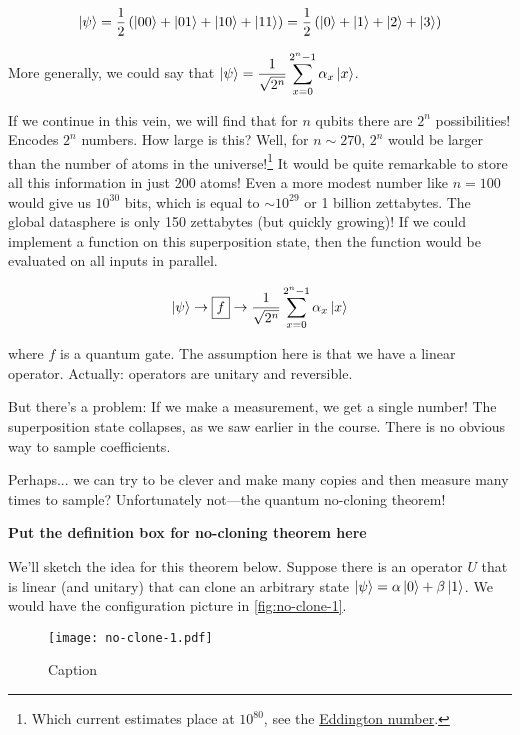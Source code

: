 \documentclass[12pt, english]{book}
\begin{document}
\begin{equation*}
	\ket{\psi} = \frac{1}{2} \left( \ket{00} + \ket{01} + \ket{10} + \ket{11} \right) = \frac{1}{2} \left( \ket{0} + \ket{1} + \ket{2} + \ket{3} \right)
\end{equation*}

More generally, we could say that $\ket{\psi} = \dfrac{1}{\sqrt{2^n}} \displaystyle\sum_{x=0}^{2^n-1} \alpha_x \ket{x}$.

If we continue in this vein, we will find that for $n$ qubits there are $2^n$ possibilities!
Encodes $2^n$ numbers. 
How large is this? 
Well, for $n \sim 270$, $2^n$ would be larger than the number of atoms in the universe!\footnote{Which current estimates place at $10^{80}$, see the \href{https://en.wikipedia.org/wiki/Eddington_number}{Eddington number}.}
It would be quite remarkable to store all this information in just 200 atoms!
Even a more modest number like $n = 100$ would give us $10^{30}$ bits, which is equal to $\sim 10^{29}$ or 1 billion zettabytes. 
The global datasphere is only 150 zettabytes (but quickly growing)!
If we could implement a function on this superposition state, then the function would be evaluated on all inputs in parallel.

\begin{equation*}
	\ket{\psi} \rightarrow \boxed{f} \rightarrow \dfrac{1}{\sqrt{2^n}} \sum_{x=0}^{2^n-1} \alpha_x \ket{x}
\end{equation*}

where $f$ is a quantum gate.
The assumption here is that we have a linear operator. 
Actually: operators are unitary and reversible.

But there's a problem: If we make a measurement, we get a single number!
The superposition state collapses, as we saw earlier in the course.
There is no obvious way to sample coefficients.

Perhaps... we can try to be clever and make many copies and then measure many times to sample?
Unfortunately not---the quantum no-cloning theorem!

\textbf{Put the definition box for no-cloning theorem here}

We'll sketch the idea for this theorem below.
Suppose there is an operator $U$ that is linear (and unitary) that can clone an arbitrary state $\ket{\psi} = \alpha \ket{0} + \beta \ket{1}$.
We would have the configuration picture in \autoref{fig:no-clone-1}.

\begin{figure}[!ht]
	\centering
	\texttt{[image: no-clone-1.pdf]}
	\caption{Caption}
	\label{fig:no-clone-1}
\end{figure}
\end{document}
